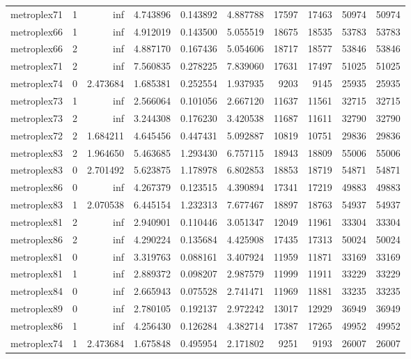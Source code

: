 \begin{longtable}{|l|r|r|r|r|r|r|r|r|r|}
metroplex71 & 1 & inf & 4.743896 & 0.143892 & 4.887788 & 17597 & 17463 & 50974 & 50974 \\
metroplex66 & 1 & inf & 4.912019 & 0.143500 & 5.055519 & 18675 & 18535 & 53783 & 53783 \\
metroplex66 & 2 & inf & 4.887170 & 0.167436 & 5.054606 & 18717 & 18577 & 53846 & 53846 \\
metroplex71 & 2 & inf & 7.560835 & 0.278225 & 7.839060 & 17631 & 17497 & 51025 & 51025 \\
metroplex74 & 0 & 2.473684 & 1.685381 & 0.252554 & 1.937935 & 9203 & 9145 & 25935 & 25935 \\
metroplex73 & 1 & inf & 2.566064 & 0.101056 & 2.667120 & 11637 & 11561 & 32715 & 32715 \\
metroplex73 & 2 & inf & 3.244308 & 0.176230 & 3.420538 & 11687 & 11611 & 32790 & 32790 \\
metroplex72 & 2 & 1.684211 & 4.645456 & 0.447431 & 5.092887 & 10819 & 10751 & 29836 & 29836 \\
metroplex83 & 2 & 1.964650 & 5.463685 & 1.293430 & 6.757115 & 18943 & 18809 & 55006 & 55006 \\
metroplex83 & 0 & 2.701492 & 5.623875 & 1.178978 & 6.802853 & 18853 & 18719 & 54871 & 54871 \\
metroplex86 & 0 & inf & 4.267379 & 0.123515 & 4.390894 & 17341 & 17219 & 49883 & 49883 \\
metroplex83 & 1 & 2.070538 & 6.445154 & 1.232313 & 7.677467 & 18897 & 18763 & 54937 & 54937 \\
metroplex81 & 2 & inf & 2.940901 & 0.110446 & 3.051347 & 12049 & 11961 & 33304 & 33304 \\
metroplex86 & 2 & inf & 4.290224 & 0.135684 & 4.425908 & 17435 & 17313 & 50024 & 50024 \\
metroplex81 & 0 & inf & 3.319763 & 0.088161 & 3.407924 & 11959 & 11871 & 33169 & 33169 \\
metroplex81 & 1 & inf & 2.889372 & 0.098207 & 2.987579 & 11999 & 11911 & 33229 & 33229 \\
metroplex84 & 0 & inf & 2.665943 & 0.075528 & 2.741471 & 11969 & 11881 & 33235 & 33235 \\
metroplex89 & 0 & inf & 2.780105 & 0.192137 & 2.972242 & 13017 & 12929 & 36949 & 36949 \\
metroplex86 & 1 & inf & 4.256430 & 0.126284 & 4.382714 & 17387 & 17265 & 49952 & 49952 \\
metroplex74 & 1 & 2.473684 & 1.675848 & 0.495954 & 2.171802 & 9251 & 9193 & 26007 & 26007 \\

\end{longtable}
